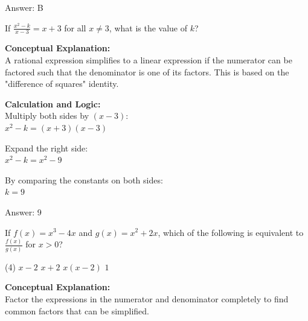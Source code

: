 \documentclass[11pt,paper=a4,answers]{exam}
\begin{document}
\begin{questions}
\begin{solution}
\vspace{25pt}

Answer: \colorbox{yellow!100}{B}
\end{solution}

\vspace{40pt}

\question
If $\frac{x^2 - k}{x - 3} = x + 3$ for all $x \neq 3$, what is the value of $k$?

\begin{solution}
\textbf{Conceptual Explanation:} \\
A rational expression simplifies to a linear expression if the numerator can be factored such that the denominator is one of its factors. This is based on the "difference of squares" identity.

\vspace{20pt}

\textbf{Calculation and Logic:} \\
Multiply both sides by $(x-3)$: \\
$x^2 - k = (x+3)(x-3)$

\vspace{10pt}

Expand the right side: \\
$x^2 - k = x^2 - 9$

\vspace{10pt}

By comparing the constants on both sides: \\
$k = 9$

\vspace{25pt}

Answer: \colorbox{yellow!100}{9}
\end{solution}

\vspace{40pt}

\question
If $f(x) = x^3 - 4x$ and $g(x) = x^2 + 2x$, which of the following is equivalent to $\frac{f(x)}{g(x)}$ for $x > 0$?
\begin{tasks}(4)
    \task $x-2$
    \task $x+2$
    \task $x(x-2)$
    \task $1$
\end{tasks}

\begin{solution}
\textbf{Conceptual Explanation:} \\
Factor the expressions in the numerator and denominator completely to find common factors that can be simplified.


\end{solution}
\end{questions}
\end{document}
